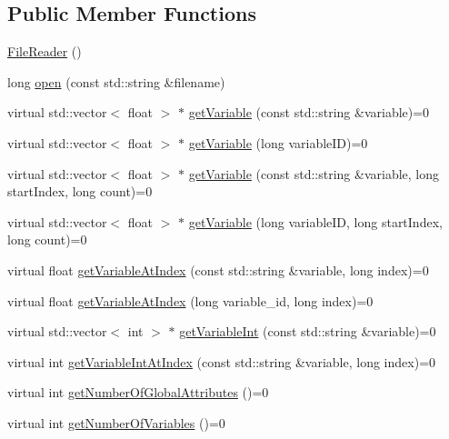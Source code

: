 \subsection*{Public Member Functions}
\begin{DoxyCompactItemize}
\item 
\hyperlink{classccmc_1_1_file_reader_a8d7df2b31965866393a4225e0955fcac}{File\-Reader} ()
\item 
long \hyperlink{classccmc_1_1_file_reader_a932f3df08ebbcdf4527be1908fec118c}{open} (const std\-::string \&filename)
\item 
virtual std\-::vector$<$ float $>$ $\ast$ \hyperlink{classccmc_1_1_file_reader_a3703180de2d7d38c1ccf115d5279d4d0}{get\-Variable} (const std\-::string \&variable)=0
\item 
virtual std\-::vector$<$ float $>$ $\ast$ \hyperlink{classccmc_1_1_file_reader_a47fafa0e59e4d5f379a48b3d0b1add6e}{get\-Variable} (long variable\-I\-D)=0
\item 
virtual std\-::vector$<$ float $>$ $\ast$ \hyperlink{classccmc_1_1_file_reader_ac8e5796569d9e7df92d6f06edf4d1d79}{get\-Variable} (const std\-::string \&variable, long start\-Index, long count)=0
\item 
virtual std\-::vector$<$ float $>$ $\ast$ \hyperlink{classccmc_1_1_file_reader_a6c127caf47837d72fa46cf5f079399dd}{get\-Variable} (long variable\-I\-D, long start\-Index, long count)=0
\item 
virtual float \hyperlink{classccmc_1_1_file_reader_afb0680751b96215f3ba350b290b62f35}{get\-Variable\-At\-Index} (const std\-::string \&variable, long index)=0
\item 
virtual float \hyperlink{classccmc_1_1_file_reader_acfe13750b7afba1cb59925e6073f1731}{get\-Variable\-At\-Index} (long variable\-\_\-id, long index)=0
\item 
virtual std\-::vector$<$ int $>$ $\ast$ \hyperlink{classccmc_1_1_file_reader_ab8f4f917ca18681189e3ac8001282c34}{get\-Variable\-Int} (const std\-::string \&variable)=0
\item 
virtual int \hyperlink{classccmc_1_1_file_reader_a1ef9e0b43e1a3f051ceea507f00598f5}{get\-Variable\-Int\-At\-Index} (const std\-::string \&variable, long index)=0
\item 
virtual int \hyperlink{classccmc_1_1_file_reader_a006779f8e665219a7de5214f4d12f80f}{get\-Number\-Of\-Global\-Attributes} ()=0
\item 
virtual int \hyperlink{classccmc_1_1_file_reader_adf9f77e1e774cd1873648cde6ba0e479}{get\-Number\-Of\-Variables} ()=0

\end{DoxyCompactItemize}

